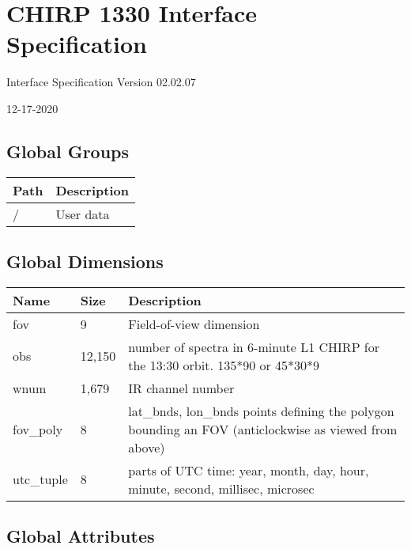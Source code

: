 \hypertarget{chirp-1330-interface-specification}{%
\section{CHIRP 1330 Interface
Specification}\label{chirp-1330-interface-specification}}

Interface Specification Version 02.02.07

12-17-2020

\hypertarget{global-groups}{%
\subsection{Global Groups}\label{global-groups}}

\begin{longtable}[]{@{}ll@{}}
\toprule
Path & Description\tabularnewline
\midrule
\endhead
/ & User data\tabularnewline
\bottomrule
\end{longtable}

\hypertarget{global-dimensions}{%
\subsection{Global Dimensions}\label{global-dimensions}}

\begin{longtable}[]{@{}lll@{}}
\toprule
Name & Size & Description\tabularnewline
\midrule
\endhead
fov & 9 & Field-of-view dimension\tabularnewline
obs & 12,150 & number of spectra in 6-minute L1 CHIRP for the 13:30
orbit. 135*90 or 45*30*9\tabularnewline
wnum & 1,679 & IR channel number\tabularnewline
fov\_poly & 8 & lat\_bnds, lon\_bnds points defining the polygon
bounding an FOV (anticlockwise as viewed from above)\tabularnewline
utc\_tuple & 8 & parts of UTC time: year, month, day, hour, minute,
second, millisec, microsec\tabularnewline
\bottomrule
\end{longtable}

\hypertarget{global-attributes}{%
\subsection{Global Attributes}\label{global-attributes}}

